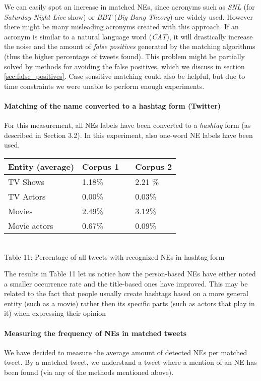 We can easily spot an increase in matched NEs, since acronyms such as \textit{SNL}
(for \textit{Saturday Night Live} show) or \textit{BBT} (\textit{Big Bang Theory}) are widely used.
However there might be many misleading acronyms created with this approach. If an acronym is similar
to a natural language word (\eg \textit{CAT}), it will drastically increase the noise and the amount
of \textit{false positives} generated by the matching algorithms (thus the higher percentage of tweets
found). This problem might be partially solved by methods for avoiding the false positives,
which we discuss in section \ref{sec:false_positives}. Case sensitive matching could also be helpful,
but due to time constraints we were unable to perform enough experiments.

\paragraph{Matching of the name converted to a hashtag form (Twitter)}
For this measurement, all NEs labels have been converted to a \textit{hashtag} form (as described
in Section 3.2). In this experiment, also one-word NE labels have been used.

\begin{center}
  \begin{tabular}{ | p{4cm} | p{2cm} | p{1cm}| p{2cm} | } \hline
    Entity (average) & Corpus 1 & & Corpus 2 \\ \hline
    TV Shows & 1.18\% & & 2.21 \% \\ \hline
    TV Actors & 0.00\% & & 0.03\% \\ \hline
    Movies & 2.49\% & & 3.12\% \\ \hline
    Movie actors & 0.67\% & & 0.09\% \\ \hline
  \end{tabular} \\
  Table 11: Percentage of all tweets with recognized NEs in hashtag form \\
\end{center}

The results in Table 11 let us notice how the person-based NEs have either noted a smaller
occurrence rate and the title-based ones have improved. This may be related to the
fact that people usually create hashtags based on a more general entity (such as
a movie) rather then its specific parts (such as actors that play in it)
when expressing their opinion \cite{edinburg-corpus}

\paragraph{Measuring the frequency of NEs in matched tweets}
We have decided to measure the average amount of detected NEs per matched tweet. By a matched tweet,
we understand a tweet where a mention of an NE has been found (via any of the methods mentioned above).

